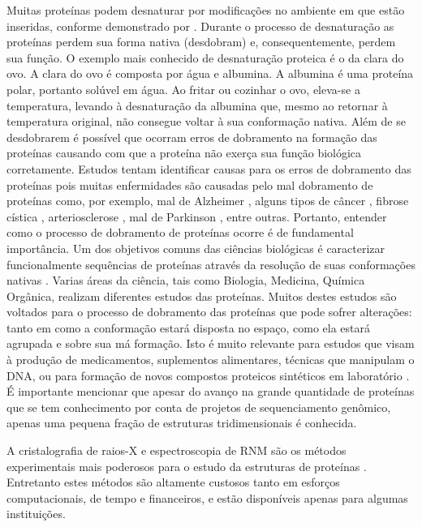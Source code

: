 Muitas proteínas podem desnaturar por modificações no ambiente em que estão inseridas, conforme demonstrado por \cite{sela1957reductive, anfinsen1972studies, anfinsen1961kinetics}. Durante o processo de desnaturação as proteínas perdem sua forma nativa (desdobram) e, consequentemente, perdem sua função. O exemplo mais conhecido de desnaturação proteica é o da clara do ovo. A clara do ovo é composta por água e albumina. A albumina é uma proteína polar, portanto solúvel em 
água. Ao fritar ou cozinhar o ovo, eleva-se a temperatura, levando à desnaturação da albumina que, mesmo ao retornar à temperatura original, não consegue voltar à sua conformação nativa. Além de se desdobrarem é possível que ocorram erros de dobramento na formação das proteínas causando com que a proteína não exerça sua função biológica corretamente. Estudos tentam identificar causas para os erros de dobramento das proteínas pois muitas enfermidades são causadas pelo mal dobramento de proteínas como, por exemplo, mal de Alzheimer \cite{hutton2001analysis, selkoe2001clearing}, alguns tipos de câncer \cite{bell2002p53, dawson2003n, ishimaru2003fibrillar}, fibrose cística \cite{thomas1992altered}, arteriosclerose
\cite{ursini2002atherosclerosis}, mal de Parkinson \cite{mcnaught2001failure}, entre outras. 
Portanto, entender como o processo de dobramento de proteínas ocorre é de fundamental importância. Um dos objetivos comuns das ciências biológicas é caracterizar funcionalmente sequências de proteínas através da resolução de suas conformações nativas \cite{eswar2003tools}. Varias áreas da ciência, tais como Biologia, Medicina, Química Orgânica, realizam diferentes estudos das proteínas. Muitos destes estudos são voltados para o processo de dobramento das proteínas que pode sofrer alterações: tanto em como a conformação estará disposta no espaço, como ela estará agrupada e sobre sua má formação. Isto é muito relevante para estudos que visam à produção de medicamentos, suplementos alimentares, técnicas que manipulam o DNA, ou para formação de novos compostos proteicos sintéticos em laboratório \cite{devlin1998manual}. É importante mencionar que apesar do avanço na grande quantidade de proteínas que se tem conhecimento por conta de projetos de sequenciamento genômico, apenas uma pequena fração de estruturas tridimensionais é conhecida.

A cristalografia de raios-X e espectroscopia de RNM são os métodos experimentais mais poderosos para o estudo da estruturas de proteínas \cite{ilari2008protein} \cite{gobl2012application}. Entretanto estes métodos são altamente custosos tanto em esforços computacionais, de tempo e financeiros, e estão disponíveis apenas para algumas instituições.


